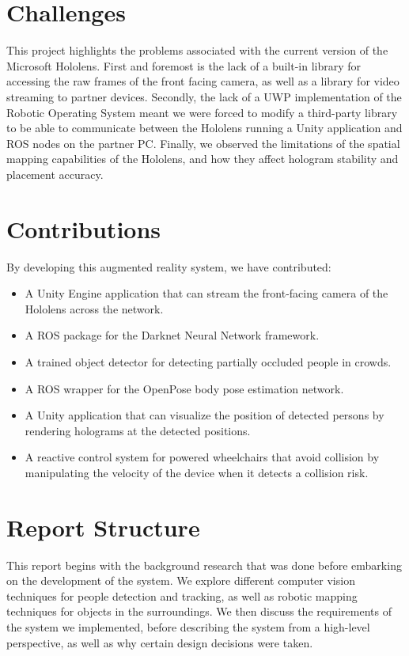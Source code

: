 \section{Challenges}
This project highlights the problems associated with the current version of the Microsoft Hololens. First and foremost is the lack of a built-in library for accessing the raw frames of the front facing camera, as well as a library for video streaming to partner devices. Secondly, the lack of a UWP implementation of the Robotic Operating System meant we were forced to modify a third-party library to be able to communicate between the Hololens running a Unity application and ROS nodes on the partner PC. Finally, we observed the limitations of the spatial mapping capabilities of the Hololens, and how they affect hologram stability and placement accuracy. 

\section{Contributions}
By developing this augmented reality system, we have contributed:

\begin{itemize}
	\item A Unity Engine application that can stream the front-facing camera of the Hololens across the network.
	\item A ROS package for the Darknet Neural Network framework.
	\item A trained object detector for detecting partially occluded people in crowds.
	\item A ROS wrapper for the OpenPose body pose estimation network.
	\item A Unity application that can visualize the position of detected persons by rendering holograms at the detected positions.
	\item A reactive control system for powered wheelchairs that avoid collision by manipulating the velocity of the device when it detects a collision risk.
\end{itemize}

\section{Report Structure}
This report begins with the background research that was done before embarking on the development of the system. We explore different computer vision techniques for people detection and tracking, as well as robotic mapping techniques for objects in the surroundings. We then discuss the requirements of the system we implemented, before describing the system from a high-level perspective, as well as why certain design decisions were taken.

